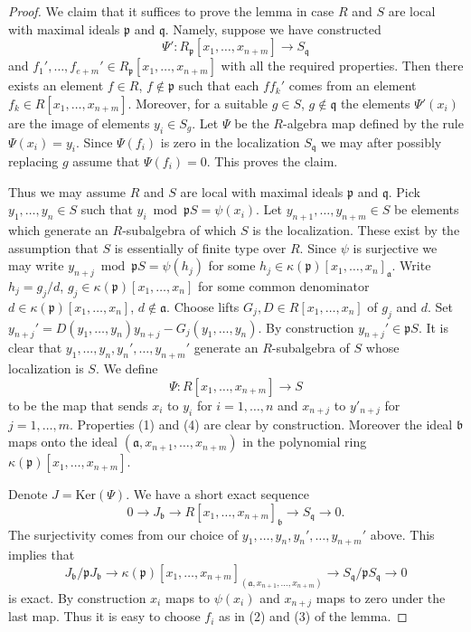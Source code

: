 \begin{proof}
We claim that it suffices to prove the lemma in case $R$
and $S$ are local with maximal ideals $\mathfrak p$ and $\mathfrak q$.
Namely, suppose we have constructed
$$
\Psi' : R_{\mathfrak p}[x_1, \ldots, x_{n + m}]
\longrightarrow
S_{\mathfrak q}
$$
and $f_1', \ldots, f_{e + m}' \in R_{\mathfrak p}[x_1, \ldots, x_{n + m}]$
with all the required properties. Then there exists an element
$f \in R$, $f \not \in \mathfrak p$ such that each
$ff_k'$ comes from an element $f_k \in R[x_1, \ldots, x_{n + m}]$.
Moreover, for a suitable $g \in S$, $g \not \in \mathfrak q$
the elements $\Psi'(x_i)$ are the image of elements
$y_i \in S_g$. Let $\Psi$ be the $R$-algebra map defined
by the rule $\Psi(x_i) = y_i$. Since $\Psi(f_i)$ is zero
in the localization $S_{\mathfrak q}$ we may after possibly
replacing $g$ assume that $\Psi(f_i) = 0$. This proves the claim.

\medskip\noindent
Thus we may assume $R$ and $S$ are local
with maximal ideals $\mathfrak p$ and $\mathfrak q$.
Pick $y_1, \ldots, y_n \in S$ such that
$y_i \bmod \mathfrak pS = \psi(x_i)$.
Let $y_{n + 1}, \ldots, y_{n + m} \in S$ be elements which generate
an $R$-subalgebra of which $S$ is the localization.
These exist by the assumption that $S$ is essentially of
finite type over $R$. Since $\psi$ is surjective we
may write $y_{n + j} \bmod \mathfrak pS = \psi(h_j)$ for
some $h_j \in \kappa(\mathfrak p)[x_1, \ldots, x_n]_{\mathfrak a}$.
Write $h_j = g_j/d$, $g_j \in \kappa(\mathfrak p)[x_1, \ldots, x_n]$
for some common denominator $d \in \kappa(\mathfrak p)[x_1, \ldots, x_n]$,
$d \not \in \mathfrak a$. Choose lifts $G_j, D \in R[x_1, \ldots, x_n]$
of $g_j$ and $d$. Set
$y_{n + j}' = D(y_1, \ldots, y_n) y_{n + j} - G_j(y_1, \ldots, y_n)$.
By construction $y_{n + j}' \in \mathfrak p S$.
It is clear that $y_1, \ldots, y_n, y_n', \ldots, y_{n + m}'$
generate an $R$-subalgebra of $S$ whose localization is $S$.
We define
$$
\Psi : R[x_1, \ldots, x_{n + m}] \to S
$$
to be the map that sends $x_i$ to $y_i$ for $i = 1, \ldots, n$
and $x_{n + j}$ to $y'_{n + j}$ for $j = 1, \ldots, m$. Properties
(1) and (4) are clear by construction. Moreover the ideal
$\mathfrak b$ maps onto the ideal
$(\mathfrak a, x_{n + 1}, \ldots, x_{n + m})$
in the polynomial ring $\kappa(\mathfrak p)[x_1, \ldots, x_{n + m}]$.

\medskip\noindent
Denote $J = \text{Ker}(\Psi)$. We have a short exact sequence
$$
0 \to J_{\mathfrak b}
\to R[x_1, \ldots, x_{n + m}]_{\mathfrak b}
\to S_{\mathfrak q}
\to 0.
$$
The surjectivity comes from our choice of
$y_1, \ldots, y_n, y_n', \ldots, y_{n + m}'$ above.
This implies that
$$
J_{\mathfrak b}/ \mathfrak pJ_{\mathfrak b}
\to \kappa(\mathfrak p)[x_1, \ldots, x_{n + m}]_{
(\mathfrak a, x_{n + 1}, \ldots, x_{n + m})}
\to S_{\mathfrak q}/\mathfrak pS_{\mathfrak q}
\to 0
$$
is exact. By construction $x_i$ maps to $\psi(x_i)$ and
$x_{n + j}$ maps to zero under the last map.
Thus it is easy to choose $f_i$ as in
(2) and (3) of the lemma.
\end{proof}






